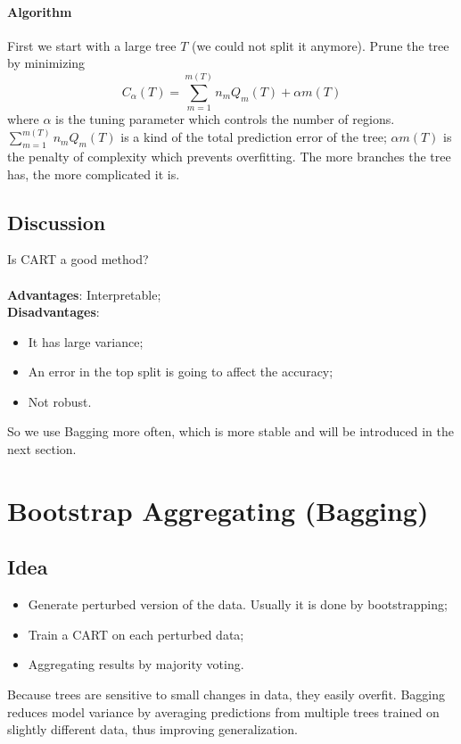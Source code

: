 \documentclass[12pt]{book}
\theoremstyle{definition}
\theoremstyle{remark}
\begin{document}
\paragraph{Algorithm}
First we start with a large tree $T$ (we could not split it anymore). Prune the tree by minimizing
\[C_\alpha(T) = \sum_{m=1}^{m(T)} n_mQ_m(T)+\alpha m(T)\]
where $\alpha$ is the tuning parameter which controls the number of regions. $\sum_{m=1}^{m(T)} n_mQ_m(T)$ is a kind of the total prediction error of the tree; $\alpha m(T)$ is the penalty of complexity which prevents overfitting. The more branches the tree has, the more complicated it is.


\subsection{Discussion}
Is CART a good method?\\
\\
\textbf{Advantages}: Interpretable;\\
\textbf{Disadvantages}: 
\begin{itemize}
    \item It has large variance;
    \item An error in the top split is going to affect the accuracy;
    \item Not robust.
\end{itemize}
So we use Bagging more often, which is more stable and will be introduced in the next section.



\newpage
\section{Bootstrap Aggregating (Bagging)}
\subsection{Idea}
\begin{itemize}
    \item Generate perturbed version of the data. Usually it is done by bootstrapping;
    \item Train a CART on each perturbed data;
    \item Aggregating results by majority voting.
\end{itemize}

Because trees are sensitive to small changes in data, they easily overfit. Bagging reduces model variance by averaging predictions from multiple trees trained on slightly different data, thus improving generalization.
\end{document}
